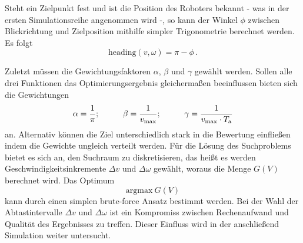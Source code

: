 Steht ein Zielpunkt fest und ist die Position des Roboters bekannt - was in der ersten Simulationsreihe angenommen wird -, so kann der Winkel $\phi$ zwischen Blickrichtung und Zielposition mithilfe simpler Trigonometrie berechnet werden. Es folgt
\begin{equation}
\text{heading}(v,\omega) = \pi - \phi\,.
\end{equation}

Zuletzt müssen die Gewichtungsfaktoren $\alpha$, $\beta$ und $\gamma$ gewählt werden. Sollen alle drei Funktionen das Optimierungsergebnis gleichermaßen beeinflussen bieten sich die Gewichtungen
\begin{equation}
\alpha = \frac{1}{\pi};\hspace{1cm} \beta = \frac{1}{v_{\text{max}}}; \hspace{1cm} \gamma = \frac{1}{v_{\text{max}}\cdot T_{\text{a}}}
\end{equation} 
an. Alternativ können die Ziel unterschiedlich stark in die Bewertung einfließen indem die Gewichte ungleich verteilt werden. Für die Lösung des Suchproblems bietet es sich an, den Suchraum zu diskretisieren, das heißt es werden Geschwindigkeitsinkremente $\Delta v$ und $\Delta \omega$ gewählt, woraus die Menge $G(V)$ berechnet wird. Das Optimum 
\begin{equation}
\text{arg}\text{max}\ G(V)
\end{equation}
kann durch einen simplen brute-force Ansatz bestimmt werden. Bei der Wahl der Abtastintervalle $\Delta v$ und $\Delta \omega$ ist ein Kompromiss zwischen Rechenaufwand und Qualität des Ergebnisses zu treffen. Dieser Einfluss wird in der anschließend Simulation weiter untersucht.